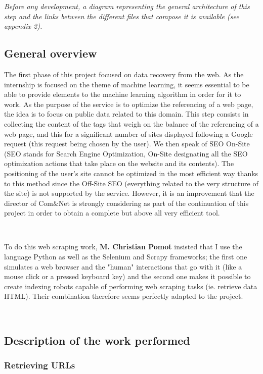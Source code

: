 \documentclass[12pt]{article}
\begin{document}
\textit{Before any development, a diagram representing the general architecture of this step and the links between the different files that compose it is available (see \textsl{appendix 2}).}

\subsection{General overview}

The first phase of this project focused on data recovery from the web. As the internship is focused on the theme of machine learning, it seems essential to be able to provide elements to the machine learning algorithm in order for it to work. As the purpose of the service is to optimize the referencing of a web page, the idea is to focus on public data related to this domain. This step consists in collecting the content of the tags that weigh on the balance of the referencing of a web page, and this for a significant number of sites displayed following a Google request (this request being chosen by the user). We then speak of SEO On-Site (SEO stands for Search Engine Optimization, On-Site designating all the SEO optimization actions that take place on the website and its contents). The positioning of the user's site cannot be optimized in the most efficient way thanks to this method since the Off-Site SEO (everything related to the very structure of the site) is not supported by the service. However, it is an improvement that the director of Com\&Net is strongly considering as part of the continuation of this project in order to obtain a complete but above all very efficient tool.

\

To do this web scraping work, \textbf{M. Christian Pomot} insisted that I use the language \textsf{Python} as well as the \textsf{Selenium} and \textsf{Scrapy} frameworks; the first one simulates a web browser and the "human" interactions that go with it (like a mouse click or a pressed keyboard key) and the second one makes it possible to create indexing robots capable of performing web scraping tasks (ie. retrieve data \textsf{HTML}). Their combination therefore seems perfectly adapted to the project.

\


\subsection{Description of the work performed}

\subsubsection{Retrieving URLs}
\end{document}
